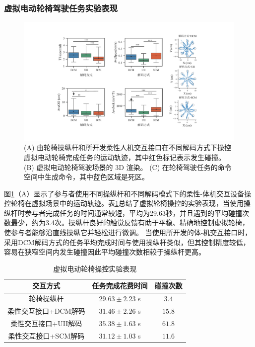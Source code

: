 \subsubsection{虚拟电动轮椅驾驶任务实验表现}     
  
\begin{figure}[htb]
    \includegraphics[width=1\textwidth]{figures/3-Fig-13.pdf}
    \caption{(A) 由轮椅操纵杆和所开发柔性人机交互接口在不同解码方式下操控虚拟电动轮椅完成任务的运动轨迹，其中红色标记表示发生碰撞。(B) 虚拟电动轮椅驾驶场景的 3D 渲染。 (C) 在轮椅驾驶任务的命令空间中生成命令，其中蓝色区域是死区。}
    \label{fig:3-13}
\end{figure}  

图\ref{fig:3-13}（A）显示了参与者使用不同操纵杆和不同解码模式下的柔性-体机交互设备操控轮椅在虚拟场景中的运动轨迹。表\ref{tab3-2}总结了虚拟轮椅操控的实验表现，当使用操纵杆时参与者完成任务的时间通常较短，平均为29.63秒，并且遇到的平均碰撞次数最少，约为3.4次。操纵杆良好的触觉反馈有助于平稳、精确地控制虚拟轮椅，使参与者能够沿直线操纵它并轻松进行微调。 当使用所开发的体-机交互接口时，采用DCM解码方式的任务平均完成时间与使用操纵杆类似，但其控制精度较低，容易在狭窄空间内发生碰撞因此平均碰撞次数相较于操纵杆更高。  

\begin{table}[htb]
 \centering
 \caption{虚拟电动轮椅操控实验表现}
 \setlength{\tabcolsep}{5pt}
 \begin{tabular}{c c c}
 \hline\hline
  交互方式 & 任务完成花费时间 & 碰撞次数  \\  
 \hline
 轮椅操纵杆&     $29.63\pm 2.23$      s&        $3.4$         \\ 
 柔性交互接口+DCM解码&        $31.46\pm 2.26$        s&        $15.8$         \\ 
 柔性交互接口+UII解码&        $35.38\pm 1.63$        s&        $61.8$         \\ 
 柔性交互接口+SCM解码&        $31.12\pm 1.03$        s&        $11.6$         \\  
 \hline\hline
 \end{tabular}
 \label{tab3-2}
\end{table}     

